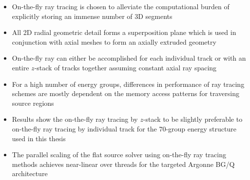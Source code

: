 \newpage
\vfill
\begin{highlightsbox}[frametitle=Highlights]
\begin{itemize}
 
 \item On-the-fly ray tracing is chosen to alleviate the computational burden of explicitly storing an immense number of 3D segments

 \item All 2D radial geometric detail forms a superposition plane which is used in conjunction with axial meshes to form an axially extruded geometry

 \item On-the-fly ray can either be accomplished for each individual track or with an entire $z$-stack of tracks together assuming constant axial ray spacing
 
 \item For a high number of energy groups, differences in performance of ray tracing schemes are mostly dependent on the memory access patterns for traversing source regions

 \item Results show the on-the-fly ray tracing by $z$-stack to be slightly preferable to on-the-fly ray tracing by individual track for the 70-group energy structure used in this thesis

 \item The parallel scaling of the flat source solver using  on-the-fly ray tracing methods achieves near-linear over threads for the targeted Argonne BG/Q architecture
 
\end{itemize}
\end{highlightsbox}
\vfill